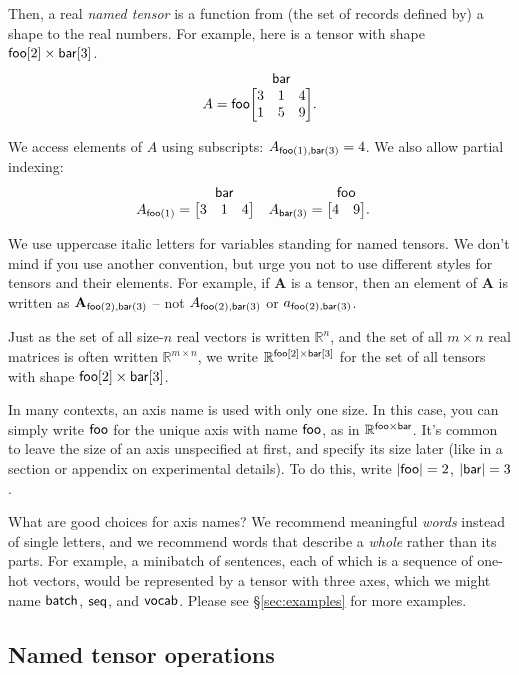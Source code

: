 \documentclass{article}
\makeatletter
\newcommand{\nmatrix}[3]{\name{#1}\begin{array}[b]{@{}c@{}}\name{#2}\\\begin{bmatrix}#3\end{bmatrix}\end{array}}
\makeatother
\begin{document}
Then, a real \emph{named tensor} is a function from (the set of records defined by) a shape to the real numbers. For example, here is a tensor with shape $\mathsf{foo}[2] \times \mathsf{bar}[3]$.
\begin{equation*}
A = \nmatrix{foo}{bar}{
  3 & 1 & 4 \\
  1 & 5 & 9
}.
\end{equation*}

We access elements of $A$ using subscripts: $A_{\mathsf{foo}(1), \mathsf{bar}(3)} = 4$.
We also allow partial indexing:
\begin{align*}
A_{\nidx{foo}{1}} &= \nmatrix{}{bar}{
  3 & 1 & 4
}
&
A_{\nidx{bar}{3}} &= \nmatrix{}{foo}{
  4 & 9
}.
\end{align*}

We use uppercase italic letters for variables standing for named tensors. We don't mind if you use another convention, but urge you not to use different styles for tensors and their elements. For example, if $\mathbf{A}$ is a tensor, then an element of $\mathbf{A}$ is written as $\mathbf{A}_{\mathsf{foo}(2), \mathsf{bar}(3)}$ -- 
not $A_{\mathsf{foo}(2),\mathsf{bar}(3)}$ or $a_{\mathsf{foo}(2),\mathsf{bar}(3)}$.

Just as the set of all size-$n$ real vectors is written $\mathbb{R}^n$, and the set of all $m\times n$ real matrices is often written $\mathbb{R}^{m \times n}$, we write $\mathbb{R}^{\mathsf{foo}[2] \times \mathsf{bar}[3]}$ for the set of all tensors with shape $\mathsf{foo}[2] \times \mathsf{bar}[3]$.

In many contexts, an axis name is used with only one size. In this case, you can simply write $\mathsf{foo}$ for the unique axis with name $\mathsf{foo}$, as in $\mathbb{R}^{\mathsf{foo} \times \mathsf{bar}}$. It's common to leave the size of an axis unspecified at first, and specify its size later (like in a section or appendix on experimental details). To do this, write $|\mathsf{foo}|=2$, $|\mathsf{bar}|=3$.

What are good choices for axis names? We recommend meaningful \emph{words} instead of single letters, and we recommend words that describe a \emph{whole} rather than its parts. For example, a minibatch of sentences, each of which is a sequence of one-hot vectors, would be represented by a tensor with three axes, which we might name $\mathsf{batch}$, $\mathsf{seq}$, and $\mathsf{vocab}$. Please see \S\ref{sec:examples} for more examples.

\subsection{Named tensor operations}
\label{sec:operations}
\end{document}
